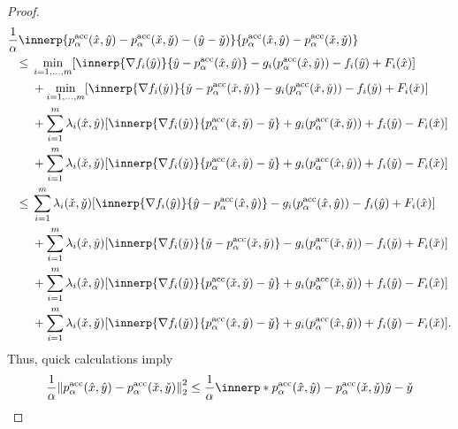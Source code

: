 \documentclass[../main]{subfiles}
\begin{document}
\begin{proof}
\begin{align}
        \MoveEqLeft \frac{1}{\alpha} \innerp{p^\acc_\alpha(\hat{x}, \hat{y}) - p^\acc_\alpha(\check{x}, \check{y}) - (\hat{y} - \check{y})}{p^\acc_\alpha(\hat{x}, \hat{y}) - p^\acc_\alpha(\check{x}, \check{y})}            \\
        \le{} & \min_{i = 1, \dots, m} [\innerp{\nabla f_i(\hat{y})}{\hat{y} - p^\acc_\alpha(\hat{x}, \hat{y})} - g_i(p^\acc_\alpha(\hat{x}, \hat{y})) - f_i(\hat{y}) + F_i(\hat{x})]                                         \\
              & + \min_{i = 1, \dots, m} [\innerp{\nabla f_i(\check{y})}{\check{y} - p^\acc_\alpha(\check{x}, \check{y})} - g_i(p^\acc_\alpha(\check{x}, \check{y})) - f_i(\check{y}) + F_i(\check{x})]                       \\
              & + \sum_{i = 1}^{m} \lambda_i(\hat{x}, \hat{y}) [\innerp{\nabla f_i(\hat{y})}{p^\acc_\alpha(\check{x}, \check{y}) - \hat{y}} + g_i(p^\acc_\alpha(\check{x}, \check{y})) + f_i(\hat{y}) - F_i(\hat{x})]         \\
              & + \sum_{i = 1}^{m} \lambda_i(\check{x}, \check{y}) [\innerp{\nabla f_i(\check{y})}{p^\acc_\alpha(\hat{x}, \hat{y}) - \check{y}} + g_i(p^\acc_\alpha(\hat{x}, \hat{y})) + f_i(\check{y}) - F_i(\check{x})]     \\
        \le{} & \sum_{i = 1}^{m} \lambda_i(\check{x}, \check{y}) [\innerp{\nabla f_i(\hat{y})}{\hat{y} - p^\acc_\alpha(\hat{x}, \hat{y})} - g_i(p^\acc_\alpha(\hat{x}, \hat{y})) - f_i(\hat{y}) + F_i(\hat{x})]               \\
              & + \sum_{i = 1}^{m} \lambda_i(\hat{x}, \hat{y}) [\innerp{\nabla f_i(\check{y})}{\check{y} - p^\acc_\alpha(\check{x}, \check{y})} - g_i(p^\acc_\alpha(\check{x}, \check{y})) - f_i(\check{y}) + F_i(\check{x})] \\
              & + \sum_{i = 1}^{m} \lambda_i(\hat{x}, \hat{y}) [\innerp{\nabla f_i(\hat{y})}{p^\acc_\alpha(\check{x}, \check{y}) - \hat{y}} + g_i(p^\acc_\alpha(\check{x}, \check{y})) + f_i(\hat{y}) - F_i(\hat{x})]         \\
              & + \sum_{i = 1}^{m} \lambda_i(\check{x}, \check{y}) [\innerp{\nabla f_i(\check{y})}{p^\acc_\alpha(\hat{x}, \hat{y}) - \check{y}} + g_i(p^\acc_\alpha(\hat{x}, \hat{y})) + f_i(\check{y}) - F_i(\check{x})]
        .\end{align}
    Thus, quick calculations imply
    \begin{align}
        \MoveEqLeft \frac{1}{\alpha} \norm*{p^\acc_\alpha(\hat{x}, \hat{y}) - p^\acc_\alpha(\check{x}, \check{y})}_2^2 \le \frac{1}{\alpha} \innerp*{p^\acc_\alpha(\hat{x}, \hat{y}) - p^\acc_\alpha(\check{x}, \check{y})}{\hat{y} - \check{y}}  \\

\end{align}
\end{proof}
\end{document}
